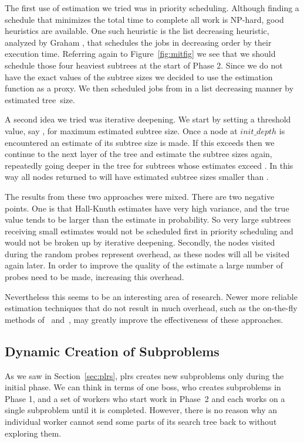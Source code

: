 \documentclass[a4paper,11pt]{article}   \usepackage{authblk} \usepackage[top=1.9cm,bottom=1.9cm,left=1.9cm,right=1.9cm]{geometry}
\newcommand{\progname}{\textsf}
\newcommand{\plrs}{\progname{plrs}\xspace}
\newcommand{\initdepth}{\ensuremath{\mathit{init\_depth}}\xspace}
\begin{document}
The first use of estimation we tried was in priority scheduling.
Although finding a schedule that minimizes the total time to complete all work is NP-hard,
good heuristics are available.
One such heuristic is the list decreasing heuristic, analyzed by  Graham \cite{Gr69},
that schedules the jobs in decreasing order by their execution time.
Referring again to 
Figure~\ref{fig:mitfig}
we see that we should schedule those four heaviest subtrees at the start of
Phase 2. Since we do not have the exact values of the subtree sizes we
decided to use the estimation function as a proxy. We then scheduled jobs
from  in a list decreasing manner by estimated tree~size.

A second idea we tried was iterative deepening.
We start by 
setting a threshold value, say , for maximum estimated subtree size.  
Once a node at \initdepth is encountered an estimate of its subtree
size is made. If this exceeds  then we continue to the next layer
of the tree and estimate the subtree sizes again, repeatedly going deeper
in the tree for subtrees whose estimates
exceed . In this way all nodes returned to  will have estimated
subtree sizes smaller than .

The results from these two approaches were mixed. There are two negative
points. One is that Hall-Knuth estimates have very high variance, and
the true value tends to be larger than the estimate in probability.
So very large subtrees receiving small estimates would not be scheduled
first in priority scheduling and would not
be broken up by iterative deepening.
Secondly, the nodes visited during the random probes
represent overhead, as these nodes will all be visited again later.
In order to improve the quality of the estimate a large number of probes
need to be made, increasing this overhead.

Nevertheless this seems to be an interesting area of research. Newer
more reliable estimation techniques that
do not result in much overhead, such as the on-the-fly methods of~\cite{CKL}
and~\cite{KSW}, may greatly improve the effectiveness of these approaches.

\subsection{Dynamic Creation of Subproblems}
\label{subsec:dynamic}

As we saw in Section~\ref{sec:plrs}, \plrs creates new subproblems only
during the initial phase.  We can think in terms of one boss, 
who creates subproblems in Phase 1, and a set of workers who 
start work in Phase~2 and 
each works on a single subproblem until it is completed.
However, there is no reason why an individual worker cannot
send some parts of its search tree back to  without exploring them.
\end{document}

